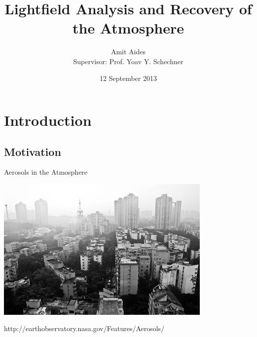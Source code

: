 \documentclass[compress,red,12pt]{beamer}
\title[3D Aerosol Recovery]{
  Lightfield Analysis and Recovery of the Atmosphere
}
\author[Amit Aides]{
  Amit Aides \\
  Supervisor: Prof. Yoav Y. Schechner
}
\date{12 September 2013}
\begin{document}
\begin{frame}
  \titlepage
\end{frame}


\section{Introduction}


\subsection{Motivation}

\begin{frame}[label=motivation]{Aerosols in the Atmosphere}
  \begin{center}
    \includegraphics[height=7cm]{images/shenzen_haze.jpg}
  \end{center}    
  \begin{center}
    \hyperlink{aerosols-data}{}\hfill
    {\tiny http://earthobservatory.nasa.gov/Features/Aerosols/}
  \end{center}
\end{frame}

\end{document}
